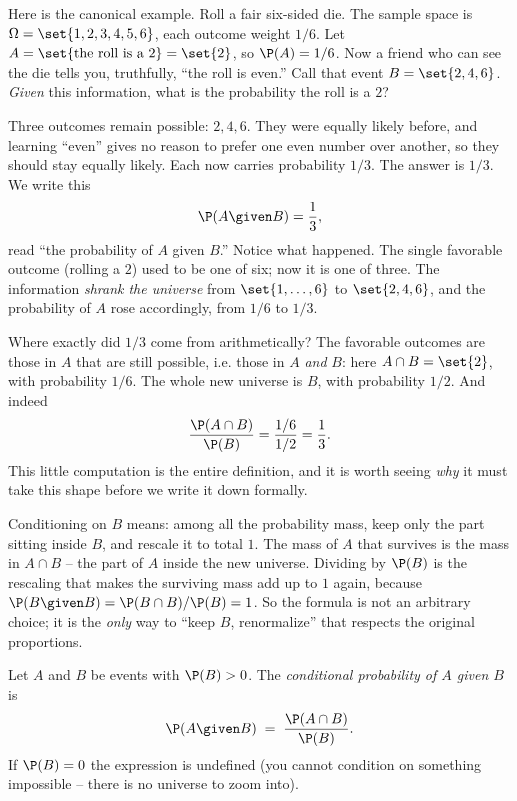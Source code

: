 Here is the canonical example. Roll a fair six-sided die. The sample space is $\Omega = \set{1,2,3,4,5,6}$, each outcome weight $1/6$. Let $A = \set{\text{the roll is a } 2} = \set{2}$, so $\P(A) = 1/6$. Now a friend who can see the die tells you, truthfully, ``the roll is even.'' Call that event $B = \set{2,4,6}$. \emph{Given} this information, what is the probability the roll is a $2$?

Three outcomes remain possible: $2, 4, 6$. They were equally likely before, and learning ``even'' gives no reason to prefer one even number over another, so they should stay equally likely. Each now carries probability $1/3$. The answer is $1/3$. We write this
\[
\P(A \given B) = \frac{1}{3},
\]
read ``the probability of $A$ given $B$.'' Notice what happened. The single favorable outcome (rolling a $2$) used to be one of six; now it is one of three. The information \emph{shrank the universe} from $\set{1,\dots,6}$ to $\set{2,4,6}$, and the probability of $A$ rose accordingly, from $1/6$ to $1/3$.

Where exactly did $1/3$ come from arithmetically? The favorable outcomes are those in $A$ that are still possible, i.e. those in $A$ \emph{and} $B$: here $A \cap B = \set{2}$, with probability $1/6$. The whole new universe is $B$, with probability $1/2$. And indeed
\[
\frac{\P(A \cap B)}{\P(B)} = \frac{1/6}{1/2} = \frac{1}{3}.
\]
This little computation is the entire definition, and it is worth seeing \emph{why} it must take this shape before we write it down formally.

\begin{whybox}
Conditioning on $B$ means: among all the probability mass, keep only the part sitting inside $B$, and rescale it to total $1$. The mass of $A$ that survives is the mass in $A \cap B$ -- the part of $A$ inside the new universe. Dividing by $\P(B)$ is the rescaling that makes the surviving mass add up to $1$ again, because $\P(B \given B) = \P(B\cap B)/\P(B) = 1$. So the formula is not an arbitrary choice; it is the \emph{only} way to ``keep $B$, renormalize'' that respects the original proportions.
\end{whybox}

\begin{definition}
\label{ch04:def-condprob}
Let $A$ and $B$ be events with $\P(B) > 0$. The \emph{conditional probability of $A$ given $B$} is
\[
\P(A \given B) \;=\; \frac{\P(A \cap B)}{\P(B)}.
\]
If $\P(B) = 0$ the expression is undefined (you cannot condition on something impossible -- there is no universe to zoom into).
\end{definition}

